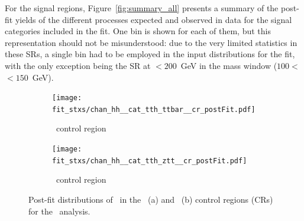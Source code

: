 For the signal regions, Figure~\ref{fig:summary_all} presents a summary of the post-fit yields of the different processes expected and observed in data for the \ttHtt signal categories included in the fit. One bin is shown for each of them, but this representation should not be misunderstood: due to the very limited statistics in these SRs, a single bin had to be employed in the input distributions for the fit, with the only exception being the SR at \pth$<200$~GeV in the mass window ($100<$\mmc$<150$~GeV).
\begin{figure}[htbp]
  \centering

  \begin{subfigure}[b]{0.48\textwidth}
    \centering
    \texttt{[image: fit\_stxs/chan\_hh\_\_cat\_tth\_ttbar\_\_cr\_postFit.pdf]}
    \caption{\small \ttbar\ control region}
    \label{fig:postfit_cr_ttbar}
  \end{subfigure}\hfill
  \begin{subfigure}[b]{0.48\textwidth}
    \centering
    \texttt{[image: fit\_stxs/chan\_hh\_\_cat\_tth\_ztt\_\_cr\_postFit.pdf]}
    \caption{\small \ztautau\ control region}
    \label{fig:postfit_cr_ztt}
  \end{subfigure}

  \caption{Post-fit distributions of \mmc\ in the \ttbar\ (a) and \ztautau\ (b) control regions (CRs) for the \ttH\ analysis.}
  \label{fig:postfit_cr_both}
\end{figure}

